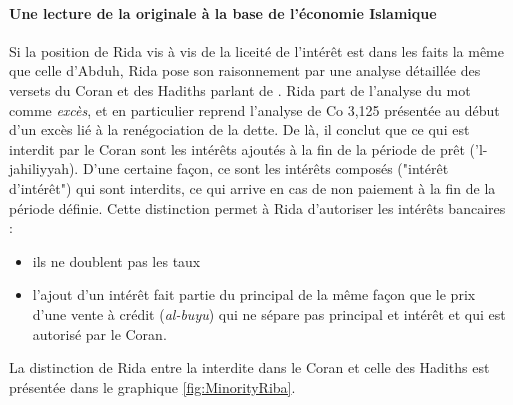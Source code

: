 \paragraph{Une lecture de la \riba originale à la base de l'économie Islamique } Si la position de Rida vis à vis de la liceité de l'intérêt est dans les faits la même que celle d'Abduh, Rida pose son raisonnement par une analyse détaillée des versets du Coran et des Hadiths parlant de \riba  \cite{Siddique:DemystifyingRiba}. 
Rida part de l'analyse du mot \riba comme \textit{excès}, et en particulier reprend l'analyse de Co 3,125 présentée au début d'un excès lié à la renégociation de la dette. De là, il conclut que ce qui est interdit par le Coran sont les intérêts ajoutés à la fin de la période de prêt (\riba ’l-jahiliyyah). D'une certaine façon, ce sont les intérêts composés ("intérêt d'intérêt") qui sont interdits, ce qui arrive en cas de non paiement à la fin de la période définie. Cette distinction permet à Rida d'autoriser les intérêts bancaires :
\begin{itemize}
    \item ils ne doublent pas les taux
    \item l'ajout d'un intérêt fait partie du principal de la même façon que le prix d'une vente à crédit (\emph{\riba al-buyu}) qui ne sépare pas principal et intérêt et qui est autorisé par le Coran.
\end{itemize}

 La distinction de Rida entre la \riba interdite dans le Coran et celle des Hadiths est présentée dans le graphique \ref{fig:MinorityRiba}.

